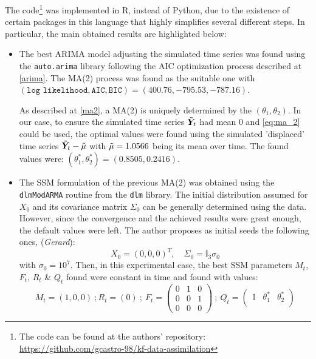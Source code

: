 \documentclass{article}
\theoremstyle{definition}
\theoremstyle{definition}
\theoremstyle{remark}
\theoremstyle{mythmstyle}
\begin{document}
The code\footnote{The code can be found at the authors' repository: \hyperlink{https://github.com/gcastro-98/kf-data-assimilation}{https://github.com/gcastro-98/kf-data-assimilation}} was implemented in R, instead of Python, due to the existence of certain packages in this language that highly simplifies several different steps. In particular, the main obtained results are highlighted below: 
\begin{itemize}
    \item The best ARIMA model adjusting the simulated time series was found using the \texttt{auto.arima} library following the AIC optimization process described at \ref{arima}. The MA(2) process was found as the suitable one with $(\texttt{log likelihood}, \texttt{AIC}, \texttt{BIC}) = (400.76, -795.53, -787.16)$. 

    As described at \ref{ma2}, a MA(2) is uniquely determined by the $(\theta_1, \theta_2)$. In our case, to ensure the simulated time series $\bm{\Tilde{Y}}_t$ had mean $0$ and \eqref{eq:ma_2} could be used, the optimal values were found using the simulated 'displaced' time series $\bm{\Tilde{Y}}_t - \Tilde{\mu}$ with $\Tilde{\mu} =1.0566$ being its mean over time. The found values were: $(\theta_1^*, \theta_2^*)=(0.8505, 0.2416)$.
    \item The SSM formulation of the previous MA(2) was obtained using the \texttt{dlmModARMA} routine from the \texttt{dlm} library. The initial distribution assumed for $X_0$ and its covariance matrix $\Sigma_0$ can be generally determined using the data. However, since the convergence and the achieved results were great enough, the default values were left. The author proposes as initial seeds the following ones, \cite{dlm} (\textit{Gerard}):
    \begin{equation}\label{eq:initials_exp}
         X_0 = ( 0, 0, 0)^T, \quad \Sigma_0 = \mathbb{I}_3 \sigma_0     
    \end{equation} with $\sigma_0 = 10^7$. 
    Then, in this experimental case, the best SSM parameters $M_t$, $F_t$, $R_t$ \& $Q_t$ found were constant in time and found with values:
    \begin{equation}
        M_t = ( 1, 0, 0) \ ; R_t = (0) \ ;\ F_t = \begin{pmatrix}
      0 & 1 & 0 \\ 0 & 0  & 1 \\ 0 & 0 & 0 
     \end{pmatrix} \ ;\  Q_t = \begin{pmatrix}
         1 & \theta_1^* & \theta_2^* \\

\end{pmatrix}
\end{equation}
\end{itemize}
\end{document}

